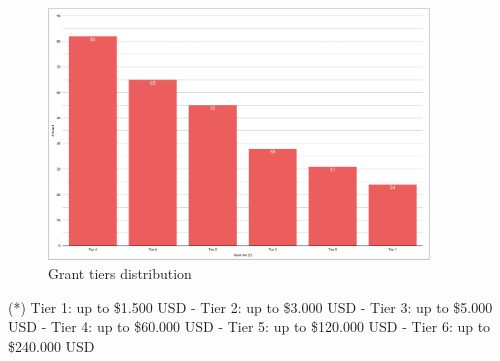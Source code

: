 \documentclass[MSE,Master,english]{twbook}%
\begin{document}
\begin{figure}[H]
  \centering
  \includegraphics[width=0.9\textwidth]{metrics/tier_distribution.png}
  \caption{Grant tiers distribution}
  \label{fig:tier_distribution}
\end{figure}
(*) Tier 1: up to \$1.500 USD - Tier 2: up to \$3.000 USD - Tier 3: up to \$5.000 USD - Tier 4: up to \$60.000 USD - Tier 5: up to \$120.000 USD - Tier 6: up to \$240.000 USD
\end{document}
